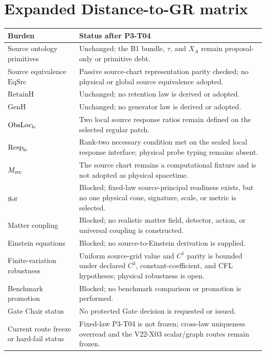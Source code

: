 \documentclass[11pt]{article}
\begin{document}
\section{Expanded Distance-to-GR matrix}

\begin{longtable}{p{}p{}}
\toprule
Burden & Status after P3-T04\\
\midrule
Source ontology primitives & Unchanged; the B1 bundle, $\tau$, and $X_A$ remain proposal-only or primitive debt.\\
Source equivalence $\mathrm{EqSrc}$ & Passive source-chart representation parity checked; no physical or global source equivalence adopted.\\
$\mathrm{RetainH}$ & Unchanged; no retention law is derived or adopted.\\
$\mathrm{GenH}$ & Unchanged; no generator law is derived or adopted.\\
$\mathrm{ObsLoc}_{\rm lc}$ & Two local source response ratios remain defined on the selected regular patch.\\
$\mathrm{Resp}_{\rm lc}$ & Rank-two necessary condition met on the sealed local response interface; physical probe typing remains absent.\\
$M_{\rm src}$ & The source chart remains a computational fixture and is not adopted as physical spacetime.\\
$g_{\rm eff}$ & Blocked; fixed-law source-principal readiness exists, but no one physical cone, signature, scale, or metric is selected.\\
Matter coupling & Blocked; no realistic matter field, detector, action, or universal coupling is constructed.\\
Einstein equations & Blocked; no source-to-Einstein derivation is supplied.\\
Finite-variation robustness & Uniform source-grid value and $C^1$ parity is bounded under declared $C^3$, constant-coefficient, and CFL hypotheses; physical robustness is open.\\
Benchmark promotion & Blocked; no benchmark comparison or promotion is performed.\\
Gate Chair status & No protected Gate decision is requested or issued.\\
Current route freeze or hard-fail status & Fixed-law P3-T04 is not frozen; cross-law uniqueness overread and the V22-X03 scalar/graph routes remain frozen.\\
\bottomrule
\end{longtable}
\end{document}
